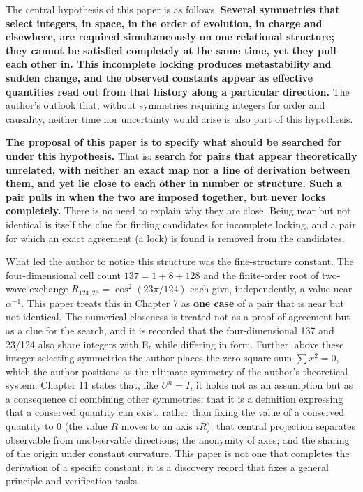 \documentclass[
  a4paper,
]{article}
\begin{document}
The central hypothesis of this paper is as follows. \textbf{Several
symmetries that select integers, in space, in the order of evolution, in
charge and elsewhere, are required simultaneously on one relational
structure; they cannot be satisfied completely at the same time, yet
they pull each other in. This incomplete locking produces metastability
and sudden change, and the observed constants appear as effective
quantities read out from that history along a particular direction.} The
author's outlook that, without symmetries requiring integers for order
and causality, neither time nor uncertainty would arise is also part of
this hypothesis.

\textbf{The proposal of this paper is to specify what should be searched
for under this hypothesis.} That is: \textbf{search for pairs that
appear theoretically unrelated, with neither an exact map nor a line of
derivation between them, and yet lie close to each other in number or
structure. Such a pair pulls in when the two are imposed together, but
never locks completely.} There is no need to explain why they are close.
Being near but not identical is itself the clue for finding candidates
for incomplete locking, and a pair for which an exact agreement (a lock)
is found is removed from the candidates.

What led the author to notice this structure was the fine-structure
constant. The four-dimensional cell count \(137=1+8+128\) and the
finite-order root of two-wave exchange \(R_{124,23}=\cos^2(23\pi/124)\)
each give, independently, a value near \(\alpha^{-1}\). This paper
treats this in Chapter 7 as \textbf{one case} of a pair that is near but
not identical. The numerical closeness is treated not as a proof of
agreement but as a clue for the search, and it is recorded that the
four-dimensional 137 and 23/124 also share integers with E₈ while
differing in form. Further, above these integer-selecting symmetries the
author places the zero square sum \(\sum x^2=0\), which the author
positions as the ultimate symmetry of the author's theoretical system.
Chapter 11 states that, like \(U^n=I\), it holds not as an assumption
but as a consequence of combining other symmetries; that it is a
definition expressing that a conserved quantity can exist, rather than
fixing the value of a conserved quantity to 0 (the value \(R\) moves to
an axis \(iR\)); that central projection separates observable from
unobservable directions; the anonymity of axes; and the sharing of the
origin under constant curvature. This paper is not one that completes
the derivation of a specific constant; it is a discovery record that
fixes a general principle and verification tasks.
\end{document}
